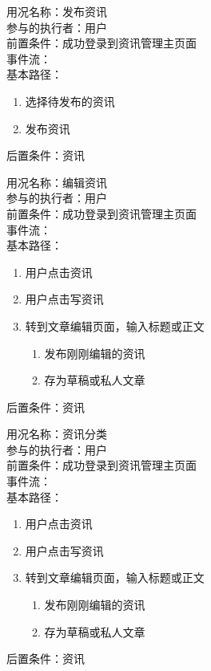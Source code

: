 \begin{framed}
\noindent
用况名称：发布资讯\\
参与的执行者：用户\\
前置条件：成功登录到资讯管理主页面\\
事件流：\\
基本路径：
\begin{enumerate}[itemsep=2pt,topsep=0pt,parsep=0pt,itemindent=1em]
     \item 选择待发布的资讯
     \item 发布资讯
\end{enumerate}
\noindent
后置条件：资讯
\end{framed}


\begin{framed}
\noindent
用况名称：编辑资讯\\
参与的执行者：用户\\
前置条件：成功登录到资讯管理主页面\\
事件流：\\
基本路径：
\begin{enumerate}[itemsep=2pt,topsep=0pt,parsep=0pt,itemindent=1em]
    \item 用户点击资讯
    \item 用户点击写资讯
    \item 转到文章编辑页面，输入标题或正文
    \begin{enumerate}[itemsep=2pt,topsep=0pt,parsep=0pt,itemindent=1em]
          \item 发布刚刚编辑的资讯
          \item 存为草稿或私人文章 
      \end{enumerate}
\end{enumerate}
\noindent
后置条件：资讯
\end{framed}

\begin{framed}
\noindent
用况名称：资讯分类\\
参与的执行者：用户\\
前置条件：成功登录到资讯管理主页面\\
事件流：\\
基本路径：
\begin{enumerate}[itemsep=2pt,topsep=0pt,parsep=0pt,itemindent=1em]
    \item 用户点击资讯
    \item 用户点击写资讯
    \item 转到文章编辑页面，输入标题或正文
    \begin{enumerate}[itemsep=2pt,topsep=0pt,parsep=0pt,itemindent=1em]
          \item 发布刚刚编辑的资讯
          \item 存为草稿或私人文章 
      \end{enumerate}
\end{enumerate}
\noindent
后置条件：资讯
\end{framed}


